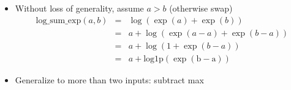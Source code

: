 \documentclass[10pt]{report}
\begin{document}
%
\begin{itemize}
\item Without loss of generality, assume $a > b$ (otherwise swap)
\vspace*{-8pt}
\begin{eqnarray*}
\mathrm{log\_sum\_exp}(a, b) & = & \log(\exp(a) + \exp(b))
\\[2pt]
& = & a + \log(\exp(a - a) + \exp(b - a))
\\[2pt]
& = & a + \log(1 + \exp(b - a))
\\[2pt]
& = & a + \mathrm{log1p(\exp(b - a))}
\end{eqnarray*}
\vspace*{-8pt}
\item Generalize to more than two inputs: subtract max
\end{itemize}



\end{document}

